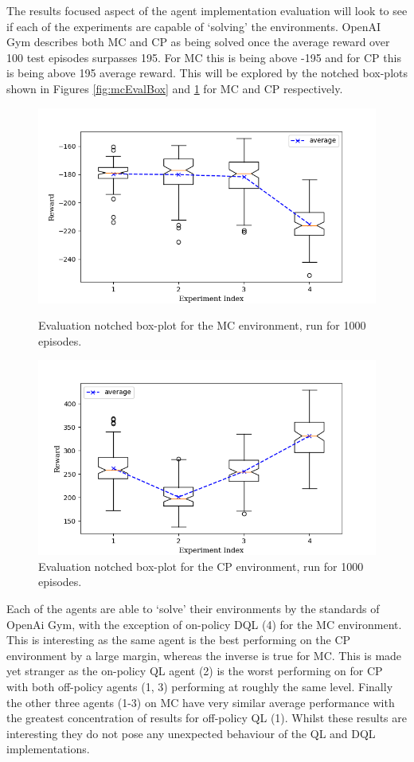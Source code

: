 \documentclass[hidelinks,journal]{IEEEtran}
\begin{document}
The results focused aspect of the agent implementation evaluation will look to see if each of the experiments are capable of ‘solving’ the environments. OpenAI Gym describes both MC and CP as being solved once the average reward over 100 test episodes surpasses 195. For MC this is being above -195 and for CP this is being above 195 average reward. This will be explored by the notched box-plots shown in Figures \ref{fig:mcEvalBox} and \ref{fig:cpEvalBox} for MC and CP respectively.

\begin{figure}[t]
  \centering
    \includegraphics[scale=0.5]{graph/mcEvalBox.png}
  \caption{Evaluation notched box-plot for the MC environment, run for 1000 episodes.}
  \label{fig:mcEvalBox}
  \centering
    \includegraphics[scale=0.5]{graph/cpEvalBox.png}
  \caption{Evaluation notched box-plot for the CP environment, run for 1000 episodes.}
  \label{fig:cpEvalBox}
\end{figure}

Each of the agents are able to ‘solve’ their environments by the standards of OpenAi Gym, with the exception of on-policy DQL (4) for the MC environment. This is interesting as the same agent is the best performing on the CP environment by a large margin, whereas the inverse is true for MC. This is made yet stranger as the on-policy QL agent (2) is the worst performing on for CP with both off-policy agents (1, 3) performing at roughly the same level. Finally the other three agents (1-3) on MC have very similar average performance with the greatest concentration of results for off-policy QL (1). Whilst these results are interesting they do not pose any unexpected behaviour of the QL and DQL implementations.
\end{document}
